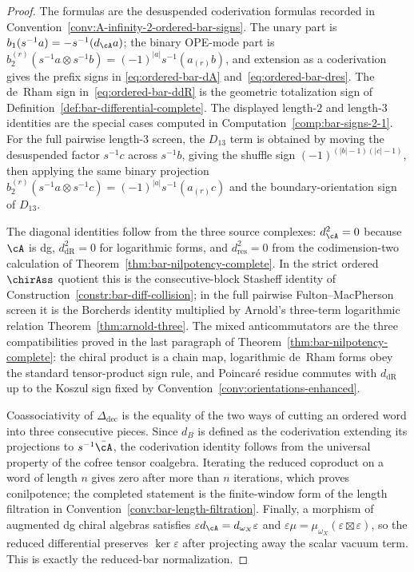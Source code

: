 \begin{proof}
The formulas are the desuspended coderivation formulas recorded in
Convention~\ref{conv:A-infinity-2-ordered-bar-signs}. The unary part is
$b_1(s^{-1}a)=-s^{-1}(d_\cA a)$; the binary OPE-mode part is
$b_2^{(r)}(s^{-1}a\otimes s^{-1}b)=(-1)^{|a|}s^{-1}(a_{(r)}b)$, and
extension as a coderivation gives the prefix signs in
\eqref{eq:ordered-bar-dA} and~\eqref{eq:ordered-bar-dres}. The
de~Rham sign in~\eqref{eq:ordered-bar-ddR} is the geometric
totalization sign of Definition~\ref{def:bar-differential-complete}.
The displayed length-$2$ and length-$3$ identities are the special
cases computed in
Computation~\ref{comp:bar-signs-2-1}. For the full pairwise
length-$3$ screen, the $D_{13}$ term is obtained by moving the
desuspended factor $s^{-1}c$ across $s^{-1}b$, giving the shuffle sign
$(-1)^{(|b|-1)(|c|-1)}$, then applying the same binary projection
$b_2^{(r)}(s^{-1}a\otimes s^{-1}c)=(-1)^{|a|}s^{-1}(a_{(r)}c)$ and the
boundary-orientation sign of $D_{13}$.

The diagonal identities follow from the three source complexes:
$d_\cA^2=0$ because $\cA$ is dg, $d_{\mathrm{dR}}^2=0$ for logarithmic forms,
and $d_{\mathrm{res}}^2=0$ from the codimension-two calculation of
Theorem~\ref{thm:bar-nilpotency-complete}. In the strict ordered
$\chirAss$ quotient this is the consecutive-block Stasheff identity of
Construction~\ref{constr:bar-diff-collision}; in the full pairwise
Fulton--MacPherson screen it is the Borcherds identity multiplied by
Arnold's three-term logarithmic relation
Theorem~\ref{thm:arnold-three}. The mixed anticommutators are the three
compatibilities proved in the last paragraph of
Theorem~\ref{thm:bar-nilpotency-complete}: the chiral product is a
chain map, logarithmic de~Rham forms obey the standard tensor-product
sign rule, and Poincar\'e residue commutes with $d_{\mathrm{dR}}$ up to the
Koszul sign fixed by Convention~\ref{conv:orientations-enhanced}.

Coassociativity of $\Delta_{\mathrm{dec}}$ is the equality of the two ways of
cutting an ordered word into three consecutive pieces. Since $d_B$ is
defined as the coderivation extending its projections to
$s^{-1}\bar\cA$, the coderivation identity follows from the universal
property of the cofree tensor coalgebra. Iterating the reduced
coproduct on a word of length $n$ gives zero after more than $n$
iterations, which proves conilpotence; the completed statement is the
finite-window form of the length filtration in
Convention~\ref{conv:bar-length-filtration}. Finally, a morphism of
augmented dg chiral algebras satisfies
$\varepsilon d_\cA=d_{\omega_X}\varepsilon$ and
$\varepsilon\mu=\mu_{\omega_X}(\varepsilon\boxtimes\varepsilon)$, so
the reduced differential preserves $\ker\varepsilon$ after projecting
away the scalar vacuum term. This is exactly the reduced-bar
normalization.
\end{proof}

